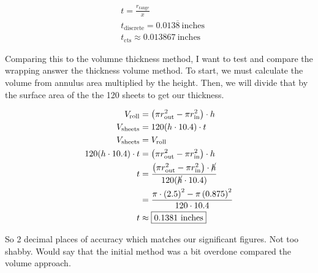 \begin{solution}
\begin{align*}
    & t = \frac{r_{\text{range}}}{x} \\
    & \boxed{t_{\text{discrete}} = 0.013\overline{8} \ \text{inches}} \\
    & \boxed{t_{\text{cts}} \approx 0.013867 \ \text{inches}} 
\end{align*}


Comparing this to the volumne thickness method, 
I want to test and compare the wrapping answer the thickness volume method. 
To start, we must calculate the volume from annulus area multiplied by the height.
Then, we will divide that by the surface area of the the 120 sheets to get our thickness.

\begin{align*}
    V_{\text{roll}} &= \left(\pi r_{\text{out}}^2 - \pi r_{\text{in}}^2\right) \cdot h \\
    V_{\text{sheets}} &= 120(h \cdot 10.4) \cdot t \\
    V_{\text{sheets}} &= V_{\text{roll}} \\
    120(h \cdot 10.4) \cdot t &= \left(\pi r_{\text{out}}^2 - \pi r_{\text{in}}^2\right) \cdot h  \\
    t &= \frac{\left(\pi r_{\text{out}}^2 - \pi r_{\text{in}}^2\right) \cdot \cancel{h}}{120(\cancel{h} \cdot 10.4)} \\
      &= \frac{\pi\cdot\left(2.5\right)^{2}-\pi\left(0.875\right)^{2}}{120\cdot10.4} \\
    t &\approx \boxed{0.1381 \ \text{inches}}
\end{align*}

So 2 decimal places of accuracy which matches our significant figures. Not too shabby.
Would say that the initial method was a bit overdone compared the volume approach.

\end{solution}
